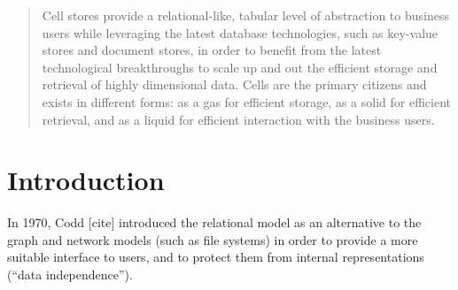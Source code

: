 \documentclass{vldb}
\begin{document}
\author{
%
%
\alignauthor
Ghislain Fourny\\
       \\
       \\
}
\date{8 September 2014}


\maketitle

\begin{abstract}
Cell stores provide a relational-like, tabular level of abstraction to business users while leveraging the latest database technologies, such as key-value stores and document stores, in order to benefit from the latest technological breakthroughs to scale up and out the efficient storage and retrieval of highly dimensional data. Cells are the primary citizens and exists in different forms: as a gas for efficient storage, as a solid for efficient retrieval, and as a liquid for efficient interaction with the business users.
\end{abstract}


\section{Introduction}
In 1970, Codd [cite] introduced the relational model as an alternative to the graph and network models (such as file systems) in order to provide a more suitable interface to users, and to protect them from internal representations (``data independence'').
\end{document}
